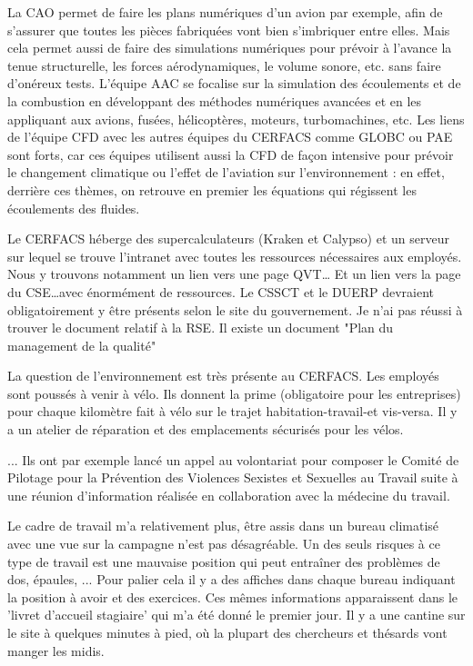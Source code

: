 La \ac{CAO} permet de faire les plans numériques d'un avion par exemple, afin de s'assurer que toutes les pièces fabriquées vont bien s'imbriquer entre elles. Mais cela permet aussi de faire des simulations numériques pour prévoir à l'avance la tenue structurelle, les forces aérodynamiques, le volume sonore, etc. sans faire d'onéreux tests.
L'équipe AAC se focalise sur la simulation des écoulements et de la combustion en développant des méthodes numériques avancées et en les appliquant aux avions, fusées, hélicoptères, moteurs, turbomachines, etc. Les liens de l’équipe CFD avec les autres équipes du CERFACS comme GLOBC ou PAE  sont forts, car ces équipes utilisent aussi la CFD de façon intensive pour prévoir le changement climatique ou l’effet de l’aviation sur l’environnement : en effet, derrière ces thèmes, on retrouve en premier les équations qui régissent les écoulements des fluides.

Le CERFACS héberge des supercalculateurs (Kraken et Calypso) et un serveur sur lequel se trouve l'intranet avec toutes les ressources nécessaires aux employés.
Nous y trouvons notamment un lien vers une page \ac{QVT}\dots
Et un lien vers la page du \ac{CSE}\dots avec énormément de ressources.
Le \ac{CSSCT} et le \ac{DUERP} devraient obligatoirement y être présents selon le site du gouvernement.
Je n'ai pas réussi à trouver le document relatif à la \ac{RSE}.
Il existe un document "Plan du management de la qualité"


La question de l’environnement est très présente au CERFACS. Les employés sont poussés à venir à vélo. Ils donnent la prime (obligatoire pour les entreprises) pour chaque kilomètre fait à vélo sur le trajet habitation-travail-et vis-versa. Il y a un atelier de réparation et des emplacements sécurisés pour les vélos.

... Ils ont par exemple lancé un appel au volontariat pour composer le Comité de Pilotage pour la Prévention des Violences Sexistes et Sexuelles au Travail suite à une réunion d'information réalisée en collaboration avec la médecine du travail.

Le cadre de travail m'a relativement plus, être assis dans un bureau climatisé avec une vue sur la campagne n'est pas désagréable. Un des seuls risques à ce type de travail est une mauvaise position qui peut entraîner des problèmes de dos, épaules, ... Pour palier cela il y a des affiches dans chaque bureau indiquant la position à avoir et des exercices. Ces mêmes informations apparaissent dans le 'livret d'accueil stagiaire' qui m'a été donné le premier jour.
Il y a une cantine sur le site à quelques minutes à pied, où la plupart des chercheurs et thésards vont manger les midis.



